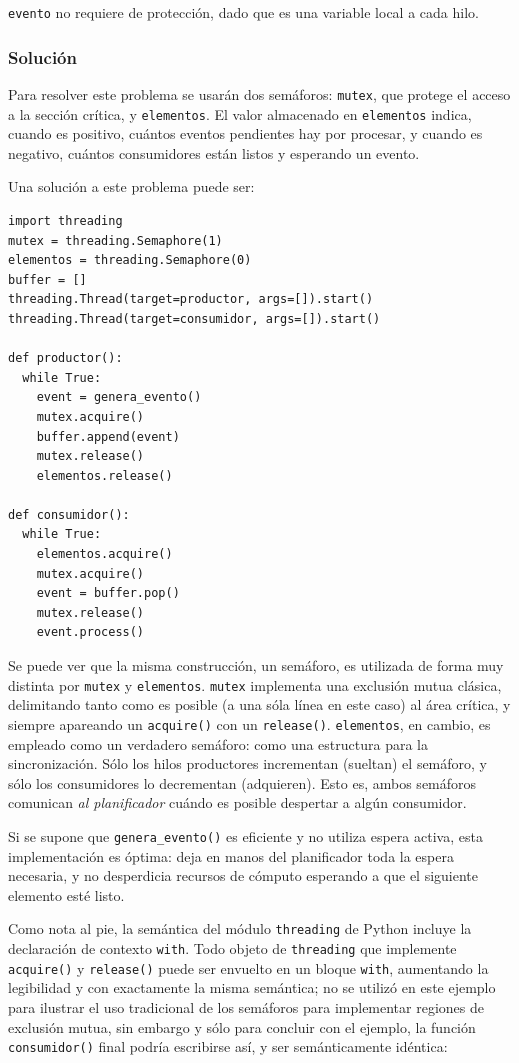 \documentclass[11pt,fleqn]{book} %
\begin{document}
  \texttt{evento} no requiere de protección, dado que es una variable local a
  cada hilo.
\subsubsection{Solución}
\label{sec-3-3-4-2}

   Para resolver este problema se usarán dos semáforos: \texttt{mutex}, que
   protege el acceso a la sección crítica, y \texttt{elementos}. El valor
   almacenado en \texttt{elementos} indica, cuando es positivo, cuántos
   eventos pendientes hay por procesar, y cuando es negativo, cuántos
   consumidores están listos y esperando un evento.

   Una solución a este problema puede ser:


\begin{verbatim}
import threading
mutex = threading.Semaphore(1)
elementos = threading.Semaphore(0)
buffer = []
threading.Thread(target=productor, args=[]).start()
threading.Thread(target=consumidor, args=[]).start()

def productor():
  while True:
    event = genera_evento()
    mutex.acquire()
    buffer.append(event)
    mutex.release()
    elementos.release()

def consumidor():
  while True:
    elementos.acquire()
    mutex.acquire()
    event = buffer.pop()
    mutex.release()
    event.process()
\end{verbatim}

   Se puede ver que la misma construcción, un semáforo, es utilizada de
   forma muy distinta por \texttt{mutex} y \texttt{elementos}. \texttt{mutex} implementa una
   exclusión mutua clásica, delimitando tanto como es posible (a una
   sóla línea en este caso) al área crítica, y siempre apareando un
   \texttt{acquire()} con un \texttt{release()}. \texttt{elementos}, en cambio, es empleado
   como un verdadero semáforo: como una estructura para la
   sincronización. Sólo los hilos productores incrementan (sueltan) el
   semáforo, y sólo los consumidores lo decrementan (adquieren). Esto
   es, ambos semáforos comunican \emph{al planificador} cuándo es posible
   despertar a algún consumidor.

   Si se supone que \texttt{genera\_evento()} es eficiente y no utiliza 
   espera activa, esta implementación es óptima: deja en manos
   del planificador toda la espera necesaria, y no desperdicia recursos
   de cómputo esperando a que el siguiente elemento esté listo.

   Como nota al pie, la semántica del módulo \texttt{threading} de Python
   incluye la declaración de contexto \texttt{with}. Todo objeto de
   \texttt{threading} que implemente \texttt{acquire()} y \texttt{release()} puede ser
   envuelto en un bloque \texttt{with}, aumentando la legibilidad y con
   exactamente la misma semántica; no se utilizó en este ejemplo para
   ilustrar el uso tradicional de los semáforos para implementar
   regiones de exclusión mutua, sin embargo y sólo para concluir con el
   ejemplo, la función \texttt{consumidor()} final podría escribirse así, y
   ser semánticamente idéntica:
\end{document}
